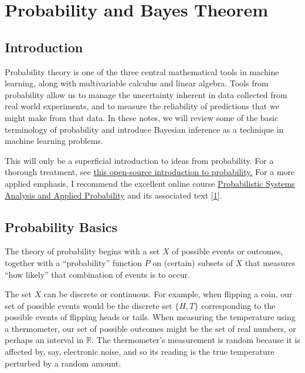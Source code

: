 \documentclass[
]{article}
\author{}
\date{}
\begin{document}
\hypertarget{probability-and-bayes-theorem}{%
\section{Probability and Bayes
Theorem}\label{probability-and-bayes-theorem}}

\hypertarget{introduction}{%
\subsection{Introduction}\label{introduction}}

Probability theory is one of the three central mathematical tools in
machine learning, along with multivariable calculus and linear algebra.
Tools from probability allow us to manage the uncertainty inherent in
data collected from real world experiments, and to measure the
reliability of predictions that we might make from that data. In these
notes, we will review some of the basic terminology of probability and
introduce Bayesian inference as a technique in machine learning
problems.

This will only be a superficial introduction to ideas from probability.
For a thorough treatment, see
\href{https://probability.oer.math.uconn.edu/3160-oer}{this open-source
introduction to probability.} For a more applied emphasis, I recommend
the excellent online course
\href{https://ocw.mit.edu/courses/electrical-engineering-and-computer-science/6-041-probabilistic-systems-analysis-and-applied-probability-fall-2010/}{Probabilistic
Systems Analysis and Applied Probability} and its associated text
{[}\protect\hyperlink{ref-Bertsekas}{1}{]}.

\hypertarget{probability-basics}{%
\subsection{Probability Basics}\label{probability-basics}}

The theory of probability begins with a set \(X\) of possible events or
outcomes, together with a ``probability'' function \(P\) on (certain)
subsets of \(X\) that measures ``how likely'' that combination of events
is to occur.

The set \(X\) can be discrete or continuous. For example, when flipping
a coin, our set of possible events would be the discrete set \(\{H,T\}\)
corresponding to the possible events of flipping heads or tails. When
measuring the temperature using a thermometer, our set of possible
outcomes might be the set of real numbers, or perhaps an interval in
\(\mathbb{R}\). The thermometer's measurement is random because it is
affected by, say, electronic noise, and so its reading is the true
temperature perturbed by a random amount.
\end{document}
